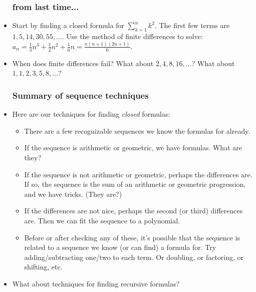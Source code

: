\begin{itemize}
\subsubsection*{from last time...}

\item Start by finding a closed formula for $\sum_{k=1}^n k^2$.  The first few terms are $1, 5, 14, 30, 55,\ldots$.  Use the method of finite differences to solve: $a_n = \frac{1}{3}n^3 + \frac{1}{2}n^2 + \frac{1}{6}n = \frac{n(n+1)(2n+1)}{6}$.

\item When does finite differences fail?  What about $2, 4, 8, 16, \ldots$?  What about $1, 1, 2, 3, 5, 8, \ldots$?

\subsubsection*{Summary of sequence techniques}

\item Here are our techniques for finding {\em closed} formulas:
\begin{itemize}
\item There are a few recognizable sequences we know the formulas for already.
\item If the sequence is arithmetic or geometric, we have formulas. What are they?
\item If the sequence is not arithmetic or geometric, perhaps the differences are.  If so, the sequence is the sum of an arithmetic or geometric progression, and we have tricks.  (They are?)
\item If the differences are not nice, perhaps the second (or third) differences are.  Then we can fit the sequence to a polynomial.
\item Before or after checking any of these, it's possible that the sequence is related to a sequence we know (or can find) a formula for.  Try adding/subtracting one/two to each term.  Or doubling, or factoring, or shifting, etc. 
\end{itemize} 

\item What about techniques for finding recursive formulas?


\end{itemize}
